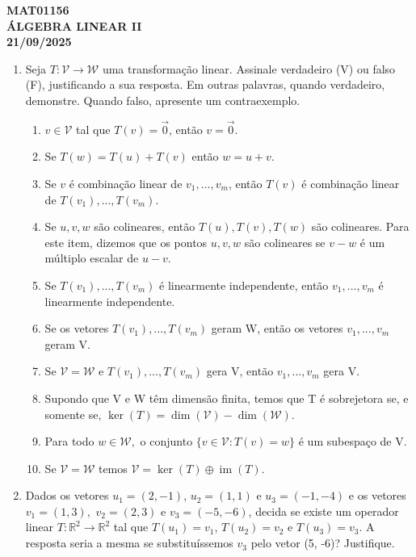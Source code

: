 \documentclass{article}
\DeclareMathOperator{\im}{im}
\begin{document}
\begin{center}
    \textbf{MAT01156 \\ ÁLGEBRA LINEAR II} \\
    \textbf{21/09/2025}
\end{center}

\begin{enumerate}
    \item Seja $T:\mathcal{V}\rightarrow\mathcal{W}$ uma transformação linear. Assinale verdadeiro (V) ou falso (F), justificando a sua resposta. Em outras palavras, quando verdadeiro, demonstre. Quando falso, apresente um contraexemplo.
    \begin{enumerate}
        \item[( \ )] $v\in\mathcal{V}$ tal que $T(v)=\vec{0}$, então $v=\vec{0}.$
        \item[( \ )] Se $T(w)=T(u)+T(v)$ então $w=u+v$.
        \item[( \ )] Se $v$ é combinação linear de $v_{1},...,v_{m}$, então $T(v)$ é combinação linear de $T(v_{1}),...,T(v_{m}).$
        \item[( \ )] Se $u, v, w$ são colineares, então $T(u), T(v), T(w)$ são colineares. Para este item, dizemos que os pontos $u, v, w$ são colineares se $v-w$ é um múltiplo escalar de $u-v$.
        \item[( \ )] Se $T(v_{1}),...,T(v_{m})$ é linearmente independente, então $v_{1},...,v_{m}$ é linearmente independente.
        \item[( \ )] Se os vetores $T(v_{1}),...,T(v_{m})$ geram W, então os vetores $v_{1},...,v_{m}$ geram V.
        \item[( \ )] Se $\mathcal{V} = \mathcal{W}$ e $T(v_1),..., T(v_m)$ gera V, então $v_{1},...,v_{m}$ gera V.
        \item[( \ )] Supondo que V e W têm dimensão finita, temos que T é sobrejetora se, e somente se, $\ker(T)=\dim(\mathcal{V})-\dim(\mathcal{W})$.
        \item[( \ )] Para todo $w\in\mathcal{W},$ o conjunto $\{v\in\mathcal{V}:T(v)=w\}$ é um subespaço de V.
        \item[( \ )] Se $\mathcal{V}=\mathcal{W}$ temos $\mathcal{V}=\ker(T)\oplus \im(T)$.
    \end{enumerate}

    \item Dados os vetores $u_{1}=(2,-1)$, $u_{2}=(1, 1)$ e $u_{3}=(-1,-4)$ e os vetores $v_{1}=(1,3),$ $v_{2}=(2,3)$ e $v_{3}=(-5,-6)$, decida se existe um operador linear $T:\mathbb{R}^{2}\rightarrow\mathbb{R}^{2}$ tal que $T(u_{1})=v_{1}$, $T(u_{2})=v_{2}$ e $T(u_{3})=v_{3}$. 
    A resposta seria a mesma se substituíssemos $v_{3}$ pelo vetor (5, -6)? Justifique.


\end{enumerate}
\end{document}
